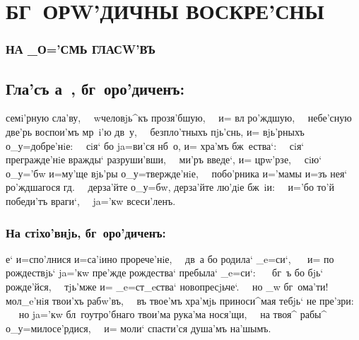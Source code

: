 \documentclass[14pt,twoside]{extreport}
\renewcommand{\*}{~~\raise3pt\hbox{\footnotesize*}}
\begin{document}

\maketitle

\stdsecondpage


\hdrcrosspage
\section[Бг~орw'дичны воскре'сны]
{\MakeUppercase{Бг~орw'дичны воскре'сны}}

\subsubsection{\MakeUppercase{на _о='смь гласw'въ}}

\subsection[Гла'съ а~]{Гла'съ а~, бг~оро'диченъ:}

семi'рную сла'ву,\* w\т человjь^къ прозя'бшую,\* и= вл
ро'ждшую,\* небе'сную две'рь воспои'мъ мр~i'ю дв~у,\*
безпло'тныхъ пjь'снь, и= вjь'рныхъ о_у=добре'нiе:\* сiя` бо
ja=ви'ся нб~о, и= хра'мъ бж~ества`:\* сiя` прегражде'нiе вражды`
разруши'вши,\* ми'ръ введе`, и= цр w'рзе,\* сiю`
о_у='бw и=му'ще вjь'ры о_у=твержде'нiе,\* побо'рника и='мамы и=зъ
нея` ро'ж\-д\-ша\-го\-ся гд.\* дерза'йте о_у=бw, дерза'йте лю'дiе
бж~iи:\* и='бо то'й победи'тъ враги`,\* ja='кw всеси'ленъ.

\subsubsection{На стiхо'внjь, бг~оро'диченъ:}

е` и=спо'лнися и=са'iино прорече'нiе,\* дв~а бо родила` _e=си`,
\* и= по рождествjь` ja='кw пре'жде рождества` пребыла` _e=си`:
\* бг~ъ бо бjь` рожде'йся,\* тjь'мже и= _e=ст_eства`
новопресjьче`.\* но _w бг~о\-ма'\-ти!\* мол_e'нiя твои'хъ
рабw'въ,\* въ твое'мъ хра'мjь приноси^мая тебjь` не пре'зри:
\* но ja='кw бл~го\-у\-тро'б\-на\-го твои'ма рука'ма нося'щи,\* на
твоя^ рабы^ о_у=милосе'рдися,\* и= моли` спасти'ся душа'мъ
на'шымъ.
\end{document}
